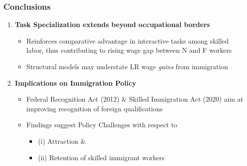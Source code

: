 \documentclass[10pt]{beamer}
\begin{document}
\begin{frame}
	\frametitle{Conclusions}
	
	\begin{enumerate}
		\item \textbf{Task Specialization extends beyond occupational borders}
		\begin{itemize}
			\item Reinforces comparative advantage in interactive tasks among skilled labor, thus contributing to rising wage gap between N and F workers
			\item Structural models may understate LR wage \textit{gains} from immigration
		\end{itemize} 
		
		
		\bigskip
		
		\item \textbf{Implications on Immigration Policy}
		\begin{itemize}
			\item Federal Recognition Act (2012) \& Skilled Immigration Act (2020) aim at improving recognition of foreign qualifications
			\item Findings suggest Policy Challenges with respect to 
				\begin{itemize}
					\item (i) Attraction \&
					\item (ii) Retention of skilled immigrant workers
				\end{itemize}
			

\end{itemize}
\end{enumerate}
\end{frame}
\end{document}
